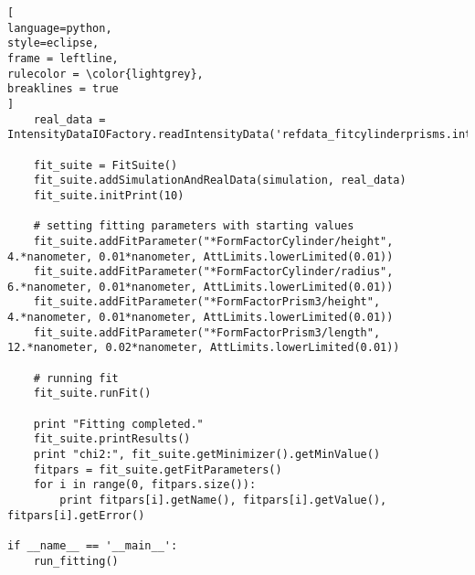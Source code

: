 \begin{lstlisting}[
language=python, 
style=eclipse, 
frame = leftline, 
rulecolor = \color{lightgrey},
breaklines = true
]
    real_data = IntensityDataIOFactory.readIntensityData('refdata_fitcylinderprisms.int.gz')
    
    fit_suite = FitSuite()
    fit_suite.addSimulationAndRealData(simulation, real_data)
    fit_suite.initPrint(10)

    # setting fitting parameters with starting values
    fit_suite.addFitParameter("*FormFactorCylinder/height", 4.*nanometer, 0.01*nanometer, AttLimits.lowerLimited(0.01))
    fit_suite.addFitParameter("*FormFactorCylinder/radius", 6.*nanometer, 0.01*nanometer, AttLimits.lowerLimited(0.01))
    fit_suite.addFitParameter("*FormFactorPrism3/height", 4.*nanometer, 0.01*nanometer, AttLimits.lowerLimited(0.01))
    fit_suite.addFitParameter("*FormFactorPrism3/length", 12.*nanometer, 0.02*nanometer, AttLimits.lowerLimited(0.01))

    # running fit
    fit_suite.runFit()
    
    print "Fitting completed."
    fit_suite.printResults()
    print "chi2:", fit_suite.getMinimizer().getMinValue()
    fitpars = fit_suite.getFitParameters()
    for i in range(0, fitpars.size()):
        print fitpars[i].getName(), fitpars[i].getValue(), fitpars[i].getError()

if __name__ == '__main__':
    run_fitting()
\end{lstlisting}

